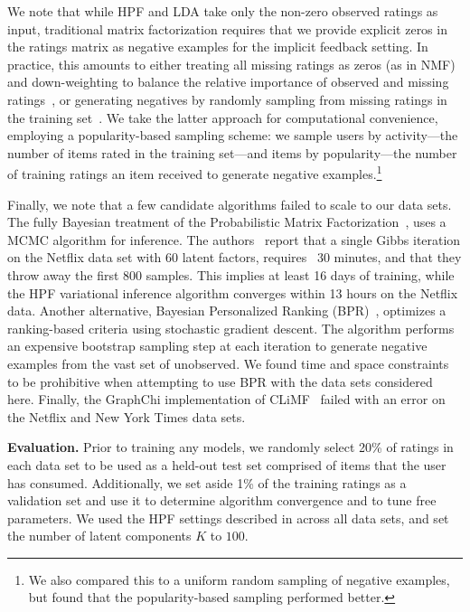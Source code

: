 We note that while HPF and LDA take only the non-zero observed
ratings as input, traditional matrix factorization requires that we
provide explicit zeros in the ratings matrix as negative examples for
the implicit feedback setting. In practice, this amounts to either
treating all missing ratings as zeros (as in NMF) and down-weighting
to balance the relative importance of observed and missing
ratings~\cite{Hu:2008p9402}, or generating negatives by randomly
sampling from missing ratings in the training
set~\cite{Gantner:2012p9364,Dror:2012a,Paquet:2013p9197}.  We take the
latter approach for computational convenience, employing a
popularity-based sampling scheme: we sample users by activity---the
number of items rated in the training set---and items by
popularity---the number of training ratings an item received to
generate negative examples.\footnote{We also compared this to a
  uniform random sampling of negative examples, but found that the
  popularity-based sampling performed better.} 

Finally, we note that a few candidate algorithms failed to scale to
our data sets. The fully Bayesian treatment of the Probabilistic
Matrix Factorization~\cite{Salakhutdinov:2008}, uses a MCMC algorithm
for inference. The authors~\cite{Salakhutdinov:2008} report that a
single Gibbs iteration on the Netflix data set with 60 latent factors,
requires ~30 minutes, and that they throw away the first 800
samples. This implies at least 16 days of training, while the HPF
variational inference algorithm converges within 13 hours on the
Netflix data. Another alternative, Bayesian Personalized Ranking
(BPR)~\cite{Rendle:2009p9243,Gantner:2012p9364}, optimizes a
ranking-based criteria using stochastic gradient descent. The
algorithm performs an expensive bootstrap sampling step at each
iteration to generate negative examples from the vast set of
unobserved. We found time and space constraints to be prohibitive when
attempting to use BPR with the data sets considered here. Finally, the
GraphChi implementation of CLiMF~\cite{kyrola2012graphchi} failed with
an error on the Netflix and New York Times data sets.


{\bf Evaluation.} Prior to training any models, we randomly select
20\% of ratings in each data set to be used as a held-out test set
comprised of items that the user has consumed. Additionally, we set
aside 1\% of the training ratings as a validation set and use it to
determine algorithm convergence and to tune free parameters. We used
the HPF settings described in  across all
data sets, and set the number of latent components $K$ to $100$.


